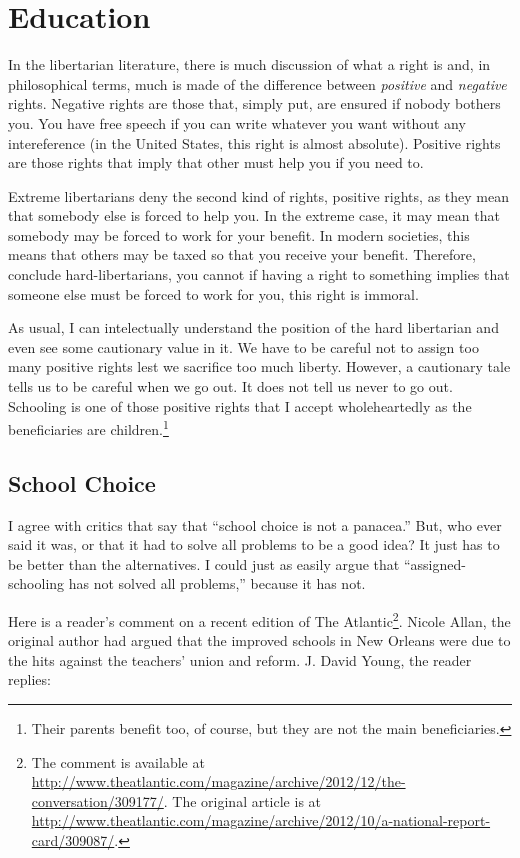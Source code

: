 \chapter{Education}%
\label{chpt:education}

In the libertarian literature, there is much discussion of what a right is and,
in philosophical terms, much is made of the difference between \emph{positive}
and \emph{negative} rights. Negative rights are those that, simply put, are
ensured if nobody bothers you. You have free speech if you can write whatever
you want without any intereference (in the United States, this right is almost
absolute). Positive rights are those rights that imply that other must help you
if you need to.

Extreme libertarians deny the second kind of rights, positive rights, as they
mean that somebody else is forced to help you. In the extreme case, it may mean
that somebody may be forced to work for your benefit. In modern societies, this
means that others may be taxed so that you receive your benefit. Therefore,
conclude hard-libertarians, you cannot if having a right to something implies
that someone else must be forced to work for you, this right is immoral.

As usual, I can intelectually understand the position of the hard libertarian
and even see some cautionary value in it. We have to be careful not to assign
too many positive rights lest we sacrifice too much liberty. However, a
cautionary tale tells us to be careful when we go out. It does not tell us
never to go out. Schooling is one of those positive rights that I accept
wholeheartedly as the beneficiaries are children.\footnote{Their parents
benefit too, of course, but they are not the main beneficiaries.}

\section{School Choice}

I agree with critics that say that ``school choice is not a panacea.'' But, who
ever said it was, or that it had to solve all problems to be a good idea? It
just has to be better than the alternatives. I could just as easily argue that
``assigned-schooling has not solved all problems,'' because it has not.

Here is a reader's comment on a recent edition of The Atlantic\footnote{The
comment is available at
\url{http://www.theatlantic.com/magazine/archive/2012/12/the-conversation/309177/}.
The original article is at
\url{http://www.theatlantic.com/magazine/archive/2012/10/a-national-report-card/309087/}.}.
Nicole Allan, the original author had argued that the improved schools in New
Orleans were due to the hits against the teachers' union and reform. J. David
Young, the reader replies:

